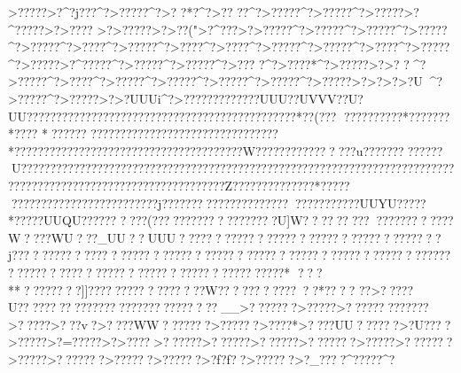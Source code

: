 {{{{{{{{{{{{{{{{{{{{{{{{{{{{{{{{{{{{{{{{{{{{{{{{{{{{{{{{{{{{{{{{{{{{{{{{{{{{{{{{{{{{{{{{{{{{{{{{{{{{{{{{{{{{{{{{{{{{{{{{{{{{{{{{{{{{{{{{{{{{{{{{{{{{{{{{{{{{{{{{{{{{{{{{{{{{{{{{{{{{{{{{{{{{{{{{{{{{{{{{{{{{{{{{{{{{{{{{{{{{{{{{{{{{{{{{{{{{{{{{{{{{{{{{{{{{{{{{{{{{{{{{{{{{{{{{{{{{{{{{{{{{{{{{{{{{{{{{{{{{{{{{{{{{{{{{{{{{{{{{{{{{{{{{{{{{{{{{{{{{{{{{{{{{{{{{{{{{{{{{{{{{{{{{{{{{{{{{{{{{{{{{{{{{{{{{{{{{{{{{{{{{{{{{{{{{{{{{{{{{{{{{{{{{{{{{{{{{{{{{{{{{{{{{{{{{{{{{{{{{{{{{{{{{{{{{{{{{{{{{{{{{{{{{{{{{{{{{{{{{{{{{{{{{{{{{{{{{{{{{{{{{{{{{{{{{{{{{{{{{{{{{{{{{{{{{{{{{{{{{{{{{{{{{{{{{{{{{{{{{{{{{{{{{{{{{{{{{{{{{{{{{{{{{{{{{{{{{{{{{{{{{{{{{{{{{{{{{{{{{{{{{{{{{{{{{{{{{{{{{{{{{{{{{{{{{{{{{{{{{{{{{{{{{{{{{{{{{{{{{{{{{{{{{{{{{{{{{{{{{{{{{{{{{{{{{{{{{{{{{{{{{{{{{{{{{{{{{{{{{{{{{{{{{{{{{{{{{{{{{{{{{{{{{{{{{{{{{{{{{{{{{{{{{{{{{{{{{{{{{{{{{{{{{{{{{{{{{{{{{{{{{{{{{{{{{{{{{{{{{{{{{{{{{{{{{{{{{{{{{{{{{{{{{{{{{{{{{{{{{{{{{{{{{{{{{{{{{{{{{{{{{{{{{{{{{{{{{{{{{{{{{{{{{{{{{{{{{{{{{{{{{{{{{{{{{{{{{{{{{{{{{{{{{{{{{{{{{{{{{{{{{{{{{{{{{{{{{{{{{{{{{{{{{{{{{{{{{{{{{{{{{{{{{{{{{{{{{{{{{{{{{{{{{{{{{{{{{{{{{{{{{{{{{{{{{{{{{{{{{{{{{{{{{{{{{{{{{{{{{{{{{{{{{{{{{{{{{{{{{{{{{{{{{{{{{{{{{{{{{{{{{{{{{{{{{{{{{{{{{{{{{{{{{{{{{{{{{{{{{{{{{{{{{{{{{{{{{{{{{{{{{{{{{{{{{{{{{{{{{{{{{{{{{{{{{{{{{{{{{{{{{{{{{{{{{{{{{{{{{{{{{{{{{{{{{{{{{{{{{{{{{{{{{{{{{{{{{{{{{{{{{{{{{{{{{{{{{{{{{{{{{{{{{{{{{{{{{{{{{{{{{{{{{{{{{{{{{{{{{{{{{{{{{{{{{{{{{{{{{{{{{{{{{{{{{{{{{{{{{{{{{{{{{{{{{{{{{{{{{{{{{{{{{{{{{{{{{{{{{{{{{{{{{{{{{{{{{{{{{{{{{{{{{{{{{{{{{{{{{{{{{{{{{{{{{{{{{{{{{{{{{{{{{{{{{{{{{{{{{{{{{{{{{{{{{{{{{{{{{{{{{{{{{{{{{{{{{{{{{{{{{{{{{{{{{{{{{{{{{{{{{{{{{{{{{{{{{{{{{{{{{{{{{{{{{{{{{{{{{{{{{{{{{{{{{{{{{{{{{{{{{{{{{{{{{{{{{{{{{{{{{{{{{{{{{{{{{{{{{{{{{{{{{{{{{{{{{{{{{{{{{{{{{{{{{{{{{{{{{{{{{{{{{{{{{{{{{{{{{{{{{{{{{{{{{{{{{{{{{{{{{{{{{{{{{{{{{{{{{{{{{{{{{{{{{{{{{{{{{{{{{{{{{{{{{{{{{{{{{{{{{{{{{{{{{{{{{{{>?????>?^?j???^?>?????^?>?
?*?^?>??
??^?>?????^?>?????^?>?????>?^?????>?>???? >?>?????>?>??(">?^???>?>?????^?>?????^?>?????^?>?????^?>?????^?>????^?>?????^?>????^?>????^?>?????^?>?????^?>????^?>?????^?>?????>?^?????^?>?????^?>?????^?>??? ?^?>????*^?>?????>?>?
 ?^?>?????^?>????^?>?????^?>?????^?>?????^?>?????^?>?????>?>?    >?>?U ^?>?????^?>?????>?>?UUUi^?>????????????? UUU??UVVV??U?UU??????????????????????????????????????    ?????  ???*??(???   ??????????*???????*???? *??????
 ??????????????????????????? ?????*???????????????????????????????????????W????????????????u?????????????}U?????????    ??????????????????????????????????????????????????????????????????????????????????????????????????????Z??????????????*??????????????????????????????j?????????????????    ????   ???????????UUYU????? *?????UUQU?????? ????(???????????????????U]W????  ???}??????????????W????WU???_UU??UUU?????????????????????????????????????j??????????????????????????????????????????????????????????????????????????}?????????????????????????????*
???**????????]]?????????????}????W????  ????????? *???? 
??>?????U??????????????????????????????__>???????>?????>?????????????>?????>???v?>????WW???????>??????>????*>????UU?? ????>?U????>?????>?=?????>?>????>??????>??????>??????>???????>?????>???????>?????>???????>??????>??????>?f?f??>??????>?_????^?????^?}}}}}}}}}}}}}}}}}}}}}}}}}}}}}}}}}}}}}}}}}}}}}}}}}}}}}}}}}}}}}}}}}}}}}}}}}}}}}}}}}}}}}}}}}}}}}}}}}}}}}}}}}}}}}}}}}}}}}}}}}}}}}}}}}}}}}}}}}}}}}}}}}}}}}}}}}}}}}}}}}}}}}}}}}}}}}}}}}}}}}}}}}}}}}}}}}}}}}}}}}}}}}}}}}}}}}}}}}}}}}}}}}}}}}}}}}}}}}}}}}}}}}}}}}}}}}}}}}}}}}}}}}}}}}}}}}}}}}}}}}}}}}}}}}}}}}}}}}}}}}}}}}}}}}}}}}}}}}}}}}}}}}}}}}}}}}}}}}}}}}}}}}}}}}}}}}}}}}}}}}}}}}}}}}}}}}}}}}}}}}}}}}}}}}}}}}}}}}}}}}}}}}}}}}}}}}}}}}}}}}}}}}}}}}}}}}}}}}}}}}}}}}}}}}}}}}}}}}}}}}}}}}}}}}}}}}}}}}}}}}}}}}}}}}}}}}}}}}}}}}}}}}}}}}}}}}}}}}}}}}}}}}}}}}}}}}}}}}}}}}}}}}}}}}}}}}}}}}}}}}}}}}}}}}}}}}}}}}}}}}}}}}}}}}}}}}}}}}}}}}}}}}}}}}}}}}}}}}}}}}}}}}}}}}}}}}}}}}}}}}}}}}}}}}}}}}}}}}}}}}}}}}}}}}}}}}}}}}}}}}}}}}}}}}}}}}}}}}}}}}}}}}}}}}}}}}}}}}}}}}}}}}}}}}}}}}}}}}}}}}}}}}}}}}}}}}}}}}}}}}}}}}}}}}}}}}}}}}}}}}}}}}}}}}}}}}}}}}}}}}}}}}}}}}}}}}}}}}}}}}}}}}}}}}}}}}}}}}}}}}}}}}}}}}}}}}}}}}}}}}}}}}}}}}}}}}}}}}}}}}}}}}}}}}}}}}}}}}}}}}}}}}}}}}}}}}}}}}}}}}}}}}}}}}}}}}}}}}}}}}}}}}}}}}}}}}}}}}}}}}}}}}}}}}}}}}}}}}}}}}}}}}}}}}}}}}}}}}}}}}}}}}}}}}}}}}}}}}}}}}}}}}}}}}}}}}}}}}}}}}}}}}}}}}}}}}}}}}}}}}}}}}}}}}}}}}}}}}}}}}}}}}}}}}}}}}}}}}}}}}}}}}}}}}}}}}}}}}}}}}}}}}}}}}}}}}}}}}}}}}}}}}}}}}}}}}}}}}}}}}}}}}}}}}}}}}}}}}}}}}}}}}}}}}}}}}}}}}}}}}}}}}}}}}}}}}}}}}}}}}}}}}}}}}}}}}}}}}}}}}}}}}}}}}}}}}}}}}}}}}}}}}}}}}}}}}}}}}}}}}}}}}}}}}}}}}}}}}}}}}}}}}}}}}}}}}}}}}}}}}}}}}}}}}}}}}}}}}}}}}}}}}}}}}}}}}}}}}}}}}}}}}}}}}}}}}}}}}}}}}}}}}}}}}}}}}}}}}}}}}}}}}}}}}}}}}}}}}}}}}}}}}}}}}}}}}}}}}}}}}}}}}}}}}}}}}}}}}}}}}}}}}}}}}}}}}}}}}}}}}}}}}}}}}}}}}}}}}}}}}}}}}}}}}}}}}}}}}}}}}}}}}}}}}}}}}}}}}}}}}}}}}}}}}}}}}}}}}}}}}}}}}}}}}}}}}}}}}}}}}}}}}}}}}}}}}}}}}}}}}}}}}}}}}}}}}}}}}}}}}}}}}}}}}}}}}}}}}}}}}}}}}}}}}}}}}}}}}}}}}}}}}}}}}}}}}}}}}}}}}}}}}}}}}}}}}}}}}}}}}}}}}}}}}}}}}}}}}}}}}}}}}}}}}}}}}}}}}}}}}}}}}}}}}}}}}}}}}}}}}}}}}}}}}}}}}}}}}}}}}}}}}}}}}}}}}}}}}}}}}}}}}}}}}}}}}}}}}}}}}}}}}}}}}}}}}}}}}}}}}}}}}}}}}}}}}}
